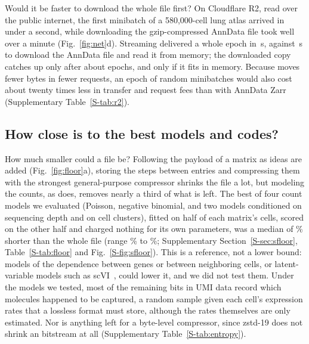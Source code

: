 Would it be faster to download the whole file first? On Cloudflare R2, read over the public internet, the first \sone{}
minibatch of a 580,000-cell lung atlas arrived in under a second, while downloading the gzip-compressed AnnData file took
well over a minute (Fig.~\ref{fig:net}d). Streaming \sone{} delivered a whole epoch in \,s, against
\,s to download the AnnData file and read it from memory; the downloaded copy catches up only after about
 epochs, and only if it fits in memory. Because \sone{} moves fewer bytes in fewer requests, an epoch
of random minibatches would also cost about twenty times less in transfer and request fees than with AnnData Zarr
(Supplementary Table~\ref{S-tab:r2}).

\subsection{How close is \sone{} to the best models and codes?}
\label{sec:floor}



How much smaller could a file be? Following the payload of a matrix as ideas are added (Fig.~\ref{fig:floor}a), storing the
steps between entries and compressing them with the strongest general-purpose compressor shrinks the file a lot, but
modeling the counts, as \sone{} does, removes nearly a third of what is left. The best of four count models we
evaluated (Poisson, negative binomial, and two models conditioned on sequencing depth and on cell clusters), fitted on
half of each matrix's cells, scored on the other half and charged nothing for its own parameters, was a median of
\% shorter than the whole \sone{} file (range \% to \%; Supplementary
Section~\ref{S-sec:sfloor}, Table~\ref{S-tab:floor} and Fig.~\ref{S-fig:sfloor}). This is a reference, not a lower bound:
models of the dependence between genes or between neighboring cells, or latent-variable models such as
scVI~\cite{lopez2018deep}, could lower it, and we did not test them. Under the models we tested, most of the remaining bits
in UMI data record which molecules happened to be captured, a random sample given each cell's expression rates that a
lossless format must store, although the rates themselves are only estimated. Nor is anything left for a byte-level
compressor, since zstd-19 does not shrink an \sone{} bitstream at all (Supplementary Table~\ref{S-tab:entropy}).

